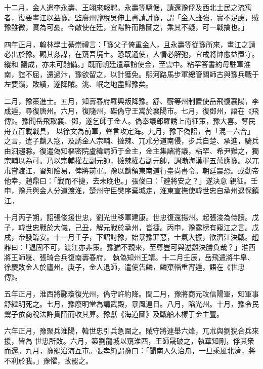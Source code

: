 \begin{pinyinscope}
 十二月，金人遣李永壽、王翊來報聘。永壽等驕倨，請還豫俘及西北士民之流寓者，復要畫江以益豫。監廣州鹽稅吳伸上書請討豫，謂「金人雖強，實不足慮，賊豫雖微，實為可憂。今敵使在廷，宜陽許而陰圖之，乘其不疑，可一戰擒也。」



 四年正月，翰林學士綦崇禮言：「豫父子倚重金人，且永壽等從豫所來，畫江之請必出於豫。觀其姦謀，在窺吾境土。恐既通使，人情必解弛，宜戒將帥愈益置守。縱和
 議成，亦未可馳備。」既而朝廷遣章誼使金，至雲中。粘罕答書約毋駐軍淮南，誼不屈，還過汴，豫欲留之，以計獲免。熙河路馬步軍總管關師古與豫兵戰于左要嶺，敗績，遂降賊。洮、岷之地盡歸豫矣。



 二月，豫策進士。五月，知壽春府羅興叛降豫。舒、蘄等州制置使岳飛復襄陽，李成遁，尋復唐州。六月，復隨州，磔偽守王嵩於襄陽市。七月，復鄧州，語在《飛傳》。豫聞岳飛取襄、鄧，遂乞師于金人。偽奉議郎羅誘上南征策，豫大喜。奪民舟五百載戰具，
 以徐文為前軍，聲言攻定海。九月，豫下偽詔，有「混一六合」之言，遣子麟入寇，及誘金人宗輔、撻辣、兀朮分道南侵，步兵自楚、承進，騎兵由泗趨滁。復遣偽知樞密院盧緯請師于金主，金主集諸將議，粘罕、希尹難之，獨宗輔以為可。乃以宗輔權左副元帥，撻辣權右副元帥，調渤海漢軍五萬應豫。以兀朮嘗渡江，習知險易，俾將前軍。豫以麟領東南道行臺尚書令。朝廷震恐。或勸帝他幸，趙鼎曰：「戰而不捷，去未晚也。」張俊曰：「避將安之？」遂決意
 親征。壬申，豫兵與金人分道渡淮，楚州守臣樊序棄城走，淮東宣撫使韓世忠自承州退保鎮江。



 十月丙子朔，詔張俊援世忠，劉光世移軍建康。世忠復還揚州。起張浚為侍讀。戊子，韓世忠戰於大儀，己丑，解元戰於承州，皆捷。丙申，豫露榜有窺江之言。戊戌，帝發臨安。十一月壬子，下詔討豫，始暴豫罪惡，士氣大振，欲濟江決戰。趙鼎曰：「退固不可，渡江亦非策。豫猶不親來，至尊豈可與逆雛決勝負哉？」淮西將王師晟、張琦合兵復南壽春府，
 執偽知州王靖。十二月壬辰，岳飛遣將牛臯、徐慶敗金人於廬州。庚子，金人退師，遣使告麟，麟棄輜重宵遁，語在《世忠傳》。



 五年正月，淮西將酈瓊復光州，偽守許約降。閏二月，豫將商元攻信陽軍，知軍事舒繼明死之。七月，豫廢明堂為講武殿，暴風連日。八月，陷光州。十月，豫令民鬻子依商稅法許貫陌而收其算。豫獻《海道圖》及戰船木樣于金主亶。



 六年正月，豫聚兵淮陽，韓世忠引兵急圍之。賊守將連舉六烽，兀朮與劉猊合兵來援，皆為
 世忠所敗。六月，築劉龍城以窺淮西，王師晟破之，執華知剛，俘其衆而還。九月，豫罷沿海互市。張孝純謂豫曰：「聞南人久治舟，一旦乘風北濟，將不利於我。」豫懼，故罷之。




\end{pinyinscope}
